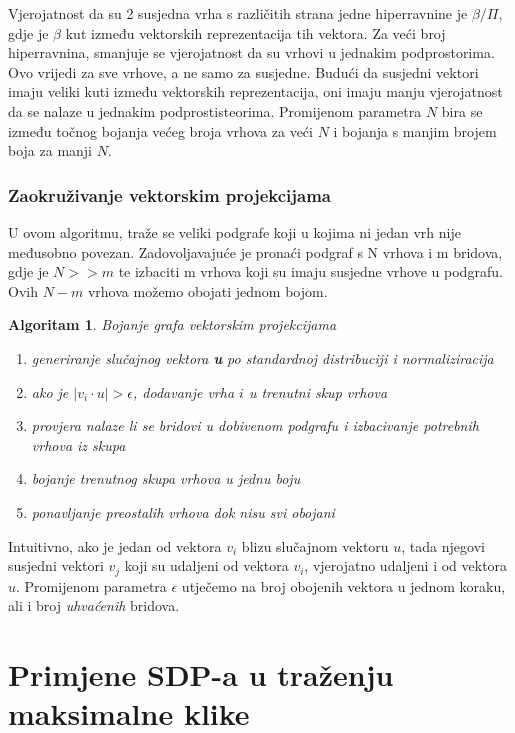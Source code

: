 \documentclass[diplomskirad]{fer}
\newtheorem{algoritam}{Algoritam}
\begin{document}
Vjerojatnost da su 2 susjedna vrha s različitih strana jedne hiperravnine je $\beta / \Pi$, gdje je $\beta$ kut između vektorskih reprezentacija
tih vektora. Za veći broj hiperravnina, smanjuje se vjerojatnost da su vrhovi u jednakim podprostorima. Ovo vrijedi za sve vrhove, a ne samo za susjedne.
Budući da susjedni vektori imaju veliki kuti između vektorskih reprezentacija, oni imaju manju vjerojatnost da se nalaze u jednakim podprostisteorima.
Promijenom parametra $N$ bira se između točnog bojanja većeg broja vrhova za veći $N$ i bojanja s manjim brojem boja za manji $N$. \cite{karger1998approximategraphcoloringsemidefinite} 


\subsection{Zaokruživanje vektorskim projekcijama}
\label{pog_vektorske_projekcije}
U ovom algoritmu, traže se veliki podgrafe koji u kojima ni jedan vrh nije međusobno povezan. Zadovoljavajuće je pronaći podgraf s N vrhova i m bridova,
gdje je $N >> m$ te izbaciti m vrhova koji su imaju susjedne vrhove u podgrafu. Ovih $N - m$ vrhova možemo obojati jednom bojom.

\begin{algoritam} Bojanje grafa vektorskim projekcijama
  \begin{enumerate}
    \item generiranje slučajnog vektora \textbf{u} po standardnoj distribuciji i normaliziracija
    \item ako je $|v_i \cdot u| > \epsilon$, dodavanje vrha $i$ u trenutni skup vrhova 
    \item provjera nalaze li se bridovi u dobivenom podgrafu i izbacivanje potrebnih vrhova iz skupa
    \item bojanje trenutnog skupa vrhova u jednu boju
    \item ponavljanje preostalih vrhova dok nisu svi obojani
  \end{enumerate}
\end{algoritam}

Intuitivno, ako je jedan od vektora $v_i$ blizu slučajnom vektoru $u$, tada njegovi susjedni vektori $v_j$ koji su udaljeni od vektora $v_i$, vjerojatno
udaljeni i od vektora $u$. Promijenom parametra $\epsilon$ utječemo na broj obojenih vektora u jednom koraku, ali i broj \textit{uhvaćenih} bridova.
  
\chapter{Primjene SDP-a u traženju maksimalne klike}
\label{pog:primjene_SDP-a_u_traženju_maksimalne_klike}
\end{document}
